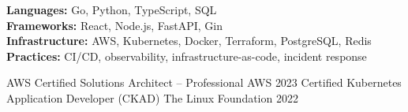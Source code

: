 \documentclass[11pt, a4paper]{awesome-cv}
\begin{document}

\begin{cvparagraph}
\textbf{Languages:} Go, Python, TypeScript, SQL \\
\textbf{Frameworks:} React, Node.js, FastAPI, Gin \\
\textbf{Infrastructure:} AWS, Kubernetes, Docker, Terraform, PostgreSQL, Redis \\
\textbf{Practices:} CI/CD, observability, infrastructure-as-code, incident response
\end{cvparagraph}

\begin{cvhonors}
  \cvhonor
    {AWS Certified Solutions Architect -- Professional}
    {AWS}
    {}
    {2023}
  \cvhonor
    {Certified Kubernetes Application Developer (CKAD)}
    {The Linux Foundation}
    {}
    {2022}
\end{cvhonors}
\end{document}
